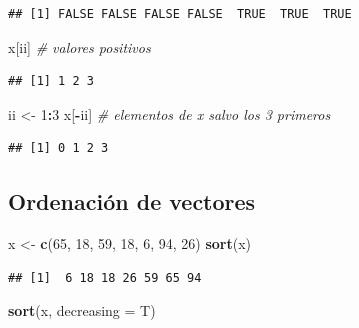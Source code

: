 \documentclass[]{book}
\newenvironment{Shaded}{\begin{snugshade}}{\end{snugshade}}
\newcommand{\CommentTok}[1]{\textcolor[rgb]{0.56,0.35,0.01}{\textit{#1}}}
\newcommand{\DataTypeTok}[1]{\textcolor[rgb]{0.13,0.29,0.53}{#1}}
\newcommand{\DecValTok}[1]{\textcolor[rgb]{0.00,0.00,0.81}{#1}}
\newcommand{\KeywordTok}[1]{\textcolor[rgb]{0.13,0.29,0.53}{\textbf{#1}}}
\newcommand{\NormalTok}[1]{#1}
\newcommand{\OperatorTok}[1]{\textcolor[rgb]{0.81,0.36,0.00}{\textbf{#1}}}
\newcommand{\StringTok}[1]{\textcolor[rgb]{0.31,0.60,0.02}{#1}}
\begin{document}
\begin{verbatim}
## [1] FALSE FALSE FALSE FALSE  TRUE  TRUE  TRUE
\end{verbatim}

\begin{Shaded}
\begin{Highlighting}[]
\NormalTok{x[ii]  }\CommentTok{# valores positivos}
\end{Highlighting}
\end{Shaded}

\begin{verbatim}
## [1] 1 2 3
\end{verbatim}

\begin{Shaded}
\begin{Highlighting}[]
\NormalTok{ii <-}\StringTok{ }\DecValTok{1}\OperatorTok{:}\DecValTok{3}
\NormalTok{x[}\OperatorTok{-}\NormalTok{ii]  }\CommentTok{# elementos de x salvo los 3 primeros}
\end{Highlighting}
\end{Shaded}

\begin{verbatim}
## [1] 0 1 2 3
\end{verbatim}

\hypertarget{ordenacion-de-vectores}{%
\subsection{Ordenación de vectores}\label{ordenacion-de-vectores}}

\begin{Shaded}
\begin{Highlighting}[]
\NormalTok{x <-}\StringTok{ }\KeywordTok{c}\NormalTok{(}\DecValTok{65}\NormalTok{, }\DecValTok{18}\NormalTok{, }\DecValTok{59}\NormalTok{, }\DecValTok{18}\NormalTok{, }\DecValTok{6}\NormalTok{, }\DecValTok{94}\NormalTok{, }\DecValTok{26}\NormalTok{)}
\KeywordTok{sort}\NormalTok{(x)}
\end{Highlighting}
\end{Shaded}

\begin{verbatim}
## [1]  6 18 18 26 59 65 94
\end{verbatim}

\begin{Shaded}
\begin{Highlighting}[]
\KeywordTok{sort}\NormalTok{(x, }\DataTypeTok{decreasing =}\NormalTok{ T)}
\end{Highlighting}
\end{Shaded}
\end{document}
